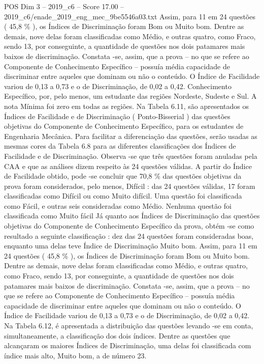 \begin{textsample}{POS Dim 3 – 2019\_c6 – Score 17.00 – 2019\_c6/enade\_2019\_eng\_mec\_9be5546a03.txt}
Assim, para 11 em 24 questões ( 45,8 \% ), os Índices de Discriminação foram Bom ou Muito bom.
Dentre as demais, nove delas foram classificadas como Médio, e outras quatro, como Fraco, sendo 13, por conseguinte, a quantidade de questões nos dois patamares mais baixos de discriminação.
Constata -se, assim, que a prova – no que se refere ao Componente de Conhecimento Específico – possuía média capacidade de discriminar entre aqueles que dominam ou não o conteúdo.
O Índice de Facilidade variou de 0,13 a 0,73 e o de Discriminação, de 0,02 a 0,42.
Conhecimento Específico, por, pelo menos, um estudante das regiões Nordeste, Sudeste e Sul.
A nota Mínima foi zero em todas as regiões.
Na Tabela 6.11, são apresentados os Índices de Facilidade e de Discriminação ( Ponto-Bisserial ) das questões objetivas do Componente de Conhecimento Específico, para os estudantes de Engenharia Mecânica.
Para facilitar a diferenciação das questões, serão usadas as mesmas cores da Tabela 6.8 para as diferentes classificações dos Índices de Facilidade e de Discriminação.
Observa -se que três questões foram anuladas pela CAA e que as análises dizem respeito às 24 questões válidas.
A partir do Índice de Facilidade obtido, pode -se concluir que 70,8 \% das questões objetivas da prova foram considerados, pelo menos, Difícil : das 24 questões válidas, 17 foram classificadas como Difícil ou como Muito difícil.
Uma questão foi classificada como Fácil, e outras seis consideradas como Médio.
Nenhuma questão foi classificada como Muito fácil Já quanto aos Índices de Discriminação das questões objetivas do Componente de Conhecimento Específico da prova, obtém -se como resultado a seguinte classificação : dez das 24 questões foram consideradas boas, enquanto uma delas teve Índice de Discriminação Muito bom.
Assim, para 11 em 24 questões ( 45,8 \% ), os Índices de Discriminação foram Bom ou Muito bom.
Dentre as demais, nove delas foram classificadas como Médio, e outras quatro, como Fraco, sendo 13, por conseguinte, a quantidade de questões nos dois patamares mais baixos de discriminação.
Constata -se, assim, que a prova – no que se refere ao Componente de Conhecimento Específico – possuía média capacidade de discriminar entre aqueles que dominam ou não o conteúdo.
O Índice de Facilidade variou de 0,13 a 0,73 e o de Discriminação, de 0,02 a 0,42.
Na Tabela 6.12, é apresentada a distribuição das questões levando -se em conta, simultaneamente, a classificação dos dois índices.
Dentre as questões que alcançaram os maiores Índices de Discriminação, uma delas foi classificada com índice mais alto, Muito bom, a de número 23.

\end{textsample}
